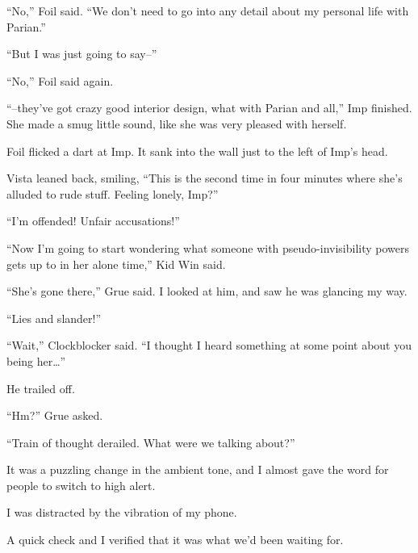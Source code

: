 ``No,'' Foil said.  ``We don't need to go into any detail about my personal life with Parian.''



``But I was just going to say--''



``No,'' Foil said again.



``--they've got crazy good interior design, what with Parian and all,'' Imp finished.  She made a smug little sound, like she was very pleased with herself.



Foil flicked a dart at Imp.  It sank into the wall just to the left of Imp's head.



Vista leaned back, smiling, ``This is the second time in four minutes where she's alluded to rude stuff.  Feeling lonely, Imp?''



``I'm offended!  Unfair accusations!''



``Now I'm going to start wondering what someone with pseudo-invisibility powers gets up to in her alone time,'' Kid Win said.



``She's gone there,'' Grue said.  I looked at him, and saw he was glancing my way.



``Lies and slander!''



``Wait,'' Clockblocker said.  ``I thought I heard something at some point about you being her\ldots''



He trailed off.



``Hm?'' Grue asked.



``Train of thought derailed.  What were we talking about?''



It was a puzzling change in the ambient tone, and I almost gave the word for people to switch to high alert.



I was distracted by the vibration of my phone.



A quick check and I verified that it was what we'd been waiting for.



